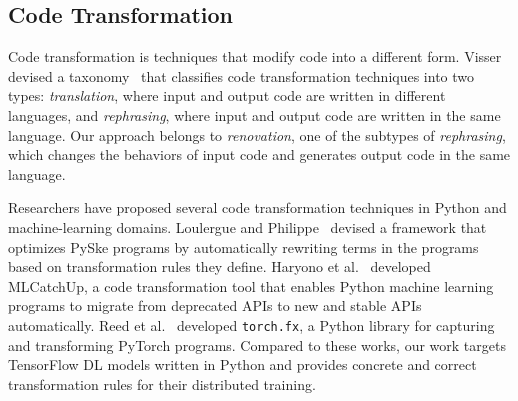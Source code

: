 \subsection{Code Transformation}

Code transformation is techniques that modify code into a different form.  
Visser devised a taxonomy~\cite{visser2001survey} that classifies code transformation
techniques into two types: 
\textit{translation}, where input and output code are written in different
languages, and \textit{rephrasing}, where input and output code are written in
the same language.
Our approach belongs to \textit{renovation}, one of the subtypes of
\textit{rephrasing}, which changes the behaviors of input code and generates
output code in the same language.


Researchers have proposed several code transformation techniques in Python
and machine-learning domains.
Loulergue and Philippe~\cite{loulergue2019automatic} devised a framework that optimizes
PySke programs by automatically rewriting terms in the programs based on
transformation rules they define.
Haryono et al.~\cite{haryono2021mlcatchup} developed MLCatchUp, a code transformation tool
that enables Python machine learning programs to migrate from deprecated APIs
to new and stable APIs automatically. 
Reed et al.~\cite{reed2022torch} developed {\tt torch.fx}, a Python library for
capturing and transforming PyTorch programs.
Compared to these works, our work targets TensorFlow DL models written in
Python and provides concrete and correct transformation rules for their
distributed training.

